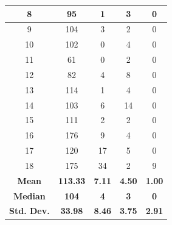 \begin{table}[!ht]
\begin{tabular}{c|c|c|c|c}
8                                   & 95              & 1               & 3              & 0                                              \\ \hline
9                                   & 104             & 3               & 2              & 0                                               \\ \hline
10                                  & 102             & 0               & 4              & 0                                              \\ \hline
11                                  & 61              & 0               & 2              & 0                                             \\ \hline
12                                  & 82              & 4               & 8              & 0                                              \\ \hline
13                                  & 114             & 1               & 4              & 0                                             \\ \hline
14                                  & 103             & 6               & 14             & 0                                            \\ \hline
15                                  & 111             & 2               & 2              & 0                                              \\ \hline
16                                  & 176             & 9               & 4              & 0                                              \\ \hline
17                                  & 120             & 17              & 5              & 0                                             \\ \hline
18                                  & 175             & 34              & 2              & 9                                              \\ \hline
\textbf{Mean}                       & \textbf{113.33} & \textbf{7.11}   & \textbf{4.50}  & \textbf{1.00}                 \\ \cline{1-5}
\textbf{Median}                     & \textbf{104}    & \textbf{4}      & \textbf{3}     & \textbf{0}                                      \\ \cline{1-5}
\textbf{Std. Dev.}                  & \textbf{33.98}  & \textbf{8.46}   & \textbf{3.75}  & \textbf{2.91}                             \\ \hline
\end{tabular}
\end{table}


